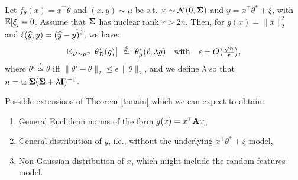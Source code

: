 \documentclass[11pt]{article}
\begin{document}
\begin{theorem}\label{t:main}
Let $f_\theta(x)=x^\top\theta$ and $(x,y)\sim\mu$
  be s.t.~$x\sim\mathcal{N}(0,\mathbf{\Sigma})$ and $y=x^\top\theta^*+\xi$,
  with $\mathbb E[\xi]=0$. Assume that $\mathbf{\Sigma}$ has nuclear rank
  $r>2n$. Then, for $g(x)=\|x\|_2^2$ 
  and $\ell(\widehat{y},y)=(\widehat{y}-y)^2$, we have:
  \begin{align*}
    \mathbb E_{\mathcal{D}\sim\mu^n}\big[\theta_{\mathcal{D}}^*(g)\big]
   \ \overset{\epsilon}{\simeq}\ \theta_\mu^*(\ell, \lambda g)
\quad    \text{with}\quad\epsilon = O\big(\tfrac{\sqrt n}r\big),
  \end{align*}
  where $\theta'\overset\epsilon\simeq\theta$ iff
  $\|\theta'-\theta\|_2\leq \epsilon\,\|\theta\|_2$, and we define
  $\lambda$ so that $n=\mathrm{tr}\,\mathbf{\Sigma}(\mathbf{\Sigma}+\lambda\mathbf I)^{-1}$.
\end{theorem}
Possible extensions of Theorem \ref{t:main} which we can expect to
obtain:
\begin{enumerate}
\item General Euclidean norms of the form $g(x) = x^\top\A x$,
\item General distribution of $y$, i.e., without the underlying
  $x^\top\theta^*+\xi$ model, 
\item Non-Gaussian distribution of $x$, which might include the random
  features model. 
\end{enumerate}
\end{document}

